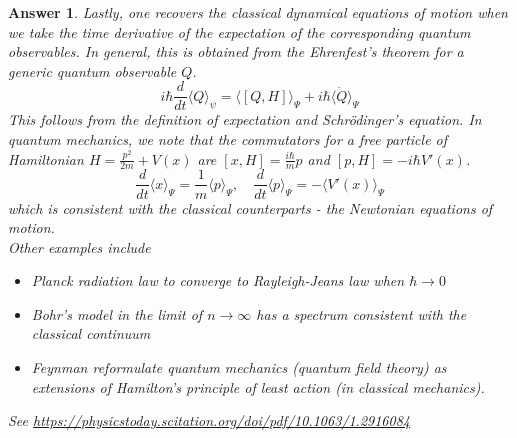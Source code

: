\documentclass[a4paper]{article}
\newtheorem{ans}{Answer}[subsection]
\theoremstyle{new}
\begin{document}
\begin{ans}
Lastly, one recovers the classical dynamical equations of motion when we take the time derivative of the expectation of the corresponding quantum observables. In general, this is obtained from the Ehrenfest's theorem for a generic quantum observable $Q$. 
$$i\hbar\frac{d}{dt}\langle Q\rangle_\psi=\langle [Q,H]\rangle_\Psi+i\hbar\langle\dot{Q}\rangle_\Psi$$
This follows from the definition of expectation and Schr\"{o}dinger's equation. In quantum mechanics, we note that the commutators for a free particle of Hamiltonian $H=\frac{p^2}{2m}+V(x)$ are $[x,H]=\frac{i\hbar}{m}p$ and $[p,H]=-i\hbar V'(x)$.
$$\frac{d}{dt}\langle x\rangle_\Psi=\frac{1}{m}\langle p\rangle_\Psi,\quad\frac{d}{dt}\langle p\rangle_\Psi=-\langle V'(x)\rangle_\Psi$$
which is consistent with the classical counterparts - the Newtonian equations of motion. \\[5pt]
Other examples include
\begin{itemize}
    \item Planck radiation law to converge to Rayleigh-Jeans law when $\hbar\rightarrow 0$
    \item Bohr's model in the limit of $n\rightarrow\infty$ has a spectrum consistent with the classical continuum
    \item Feynman reformulate quantum mechanics (quantum field theory) as extensions of Hamilton's principle of least action (in classical mechanics).
\end{itemize}
See \url{https://physicstoday.scitation.org/doi/pdf/10.1063/1.2916084}

\end{ans}
\end{document}
